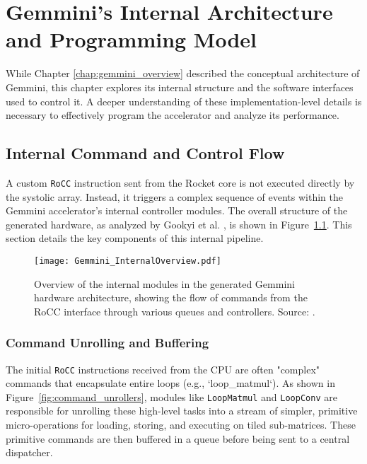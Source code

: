 \chapter{Gemmini's Internal Architecture and Programming Model}
\label{chap:gemmini_internals}

While Chapter \ref{chap:gemmini_overview} described the conceptual architecture of Gemmini, this chapter explores its internal structure and the software interfaces used to control it. A deeper understanding of these implementation-level details is necessary to effectively program the accelerator and analyze its performance.

\section{Internal Command and Control Flow}
\label{sec:gemmini_internal_flow}

A custom \texttt{RoCC} instruction sent from the Rocket core is not executed directly by the systolic array. Instead, it triggers a complex sequence of events within the Gemmini accelerator's internal controller modules. The overall structure of the generated hardware, as analyzed by Gookyi et al. \cite{gookyi2023gemmini_case_study}, is shown in Figure~\ref{fig:gemmini_internal_modules}. This section details the key components of this internal pipeline.

\begin{figure}[htbp]
    \centering
    \texttt{[image: Gemmini\_InternalOverview.pdf]}
    \caption{Overview of the internal modules in the generated Gemmini hardware architecture, showing the flow of commands from the RoCC interface through various queues and controllers. Source: \cite{gookyi2023gemmini_case_study}.}
    \label{fig:gemmini_internal_modules}
\end{figure}

\subsection{Command Unrolling and Buffering}
The initial \texttt{RoCC} instructions received from the CPU are often "complex" commands that encapsulate entire loops (e.g., `loop\_matmul`). As shown in Figure~\ref{fig:command_unrollers}, modules like \texttt{LoopMatmul} and \texttt{LoopConv} are responsible for unrolling these high-level tasks into a stream of simpler, primitive micro-operations for loading, storing, and executing on tiled sub-matrices. These primitive commands are then buffered in a queue before being sent to a central dispatcher.

